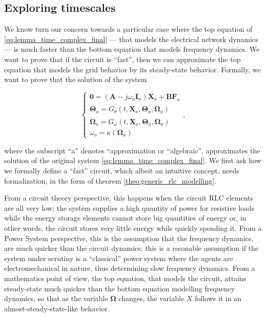 \subsection{Exploring timescales} %

	We know turn our concern towards a particular case where the top equation of \eqref{eq:lemma_time_complex_final} — that models the electrical network dynamics — is much faster than the bottom equation that models frequency dynamics. We want to prove that if the circuit is ``fast'', then we can approximate the top equation that models the grid behavior by its steady-state behavior. Formally, we want to prove that the solution of the system

\begin{equation}
	\left\{\begin{array}{l}
		\mathbf{0} = \left(\mathbf{A} - j\omega_a \mathbf{I}_n\right)\mathbf{X}_a + \mathbf{BF}_a \\[2mm]
		\dot{\boldsymbol{\Theta}}_a = G_\theta\left(t,\mathbf{X}_a,\boldsymbol{\Theta}_a,\boldsymbol{\Omega}_a\right) \\[2mm]
		\dot{\boldsymbol{\Omega}}_a = G_\omega\left(t,\mathbf{X}_a,\boldsymbol{\Theta}_a,\boldsymbol{\Omega}_a\right) \\[2mm]
		\omega_a = \kappa\left(\boldsymbol{\Omega}_a\right)
	\end{array}\right. ,\label{eq:lemma_time_complex_final_approx}
\end{equation}

	\noindent where the subscript ``a'' denotes ``approximation or ``algebraic'', approximates the solution of the original system \eqref{eq:lemma_time_complex_final}. We first ask how we formally define a ``fast'' circuit, which albeit an intuitive concept, needs formalization, in the form of theorem \ref{theo:generic_rlc_modelling}.

	From a circuit theory perspective, this happens when the circuit RLC elements are all very low; the system supplies a high quantity of power for resistive loads while the energy storage elements cannot store big quantities of energy or, in other words, the circuit stores very little energy while quickly spending it. From a Power System perspective, this is the assumption that the frequency dynamics, are much quicker than the circuit dynamics; this is a resonable assumption if the system under scrutiny is a ``classical'' power system where the agents are electromechanical in nature, thus determining slow frequency dynamics. From a mathematics point of view, the top equation, that models the circuit, attains steady-state much quicker than the bottom equation modelling frequency dynamics, so that as the variable $\boldsymbol{\Omega}$ changes, the variable $X$ follows it in an almost-steady-state-like behavior.

